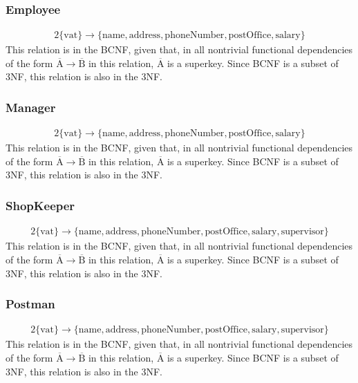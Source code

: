 \documentclass{report}[a4paper]
\theoremstyle{remark}
\begin{document}
\subsubsection{Employee}
\begin{alignat*}{2}
    \{\text{vat}\} \rightarrow \{\text{name},\text{address},\text{phoneNumber},\text{postOffice},\text{salary}\}
\end{alignat*}
This relation is in the BCNF, given that, in all nontrivial functional dependencies of the form $\overline{\text{A}} \rightarrow \overline{\text{B}}$ in this relation, $\overline{\text{A}}$ is a superkey. Since BCNF is a subset of 3NF, this relation is also in the 3NF.
\subsubsection{Manager}
\begin{alignat*}{2}
    \{\text{vat}\} \rightarrow \{\text{name},\text{address},\text{phoneNumber},\text{postOffice},\text{salary}\}
\end{alignat*}
This relation is in the BCNF, given that, in all nontrivial functional dependencies of the form $\overline{\text{A}} \rightarrow \overline{\text{B}}$ in this relation, $\overline{\text{A}}$ is a superkey. Since BCNF is a subset of 3NF, this relation is also in the 3NF.
\subsubsection{ShopKeeper}
\begin{alignat*}{2}
    \{\text{vat}\} \rightarrow \{\text{name},\text{address},\text{phoneNumber},\text{postOffice},\text{salary}, \text{supervisor}\}
\end{alignat*}
This relation is in the BCNF, given that, in all nontrivial functional dependencies of the form $\overline{\text{A}} \rightarrow \overline{\text{B}}$ in this relation, $\overline{\text{A}}$ is a superkey. Since BCNF is a subset of 3NF, this relation is also in the 3NF.
\subsubsection{Postman}
\begin{alignat*}{2}
    \{\text{vat}\} \rightarrow \{\text{name},\text{address},\text{phoneNumber},\text{postOffice},\text{salary}, \text{supervisor}\}
\end{alignat*}
This relation is in the BCNF, given that, in all nontrivial functional dependencies of the form $\overline{\text{A}} \rightarrow \overline{\text{B}}$ in this relation, $\overline{\text{A}}$ is a superkey. Since BCNF is a subset of 3NF, this relation is also in the 3NF.
\end{document}
